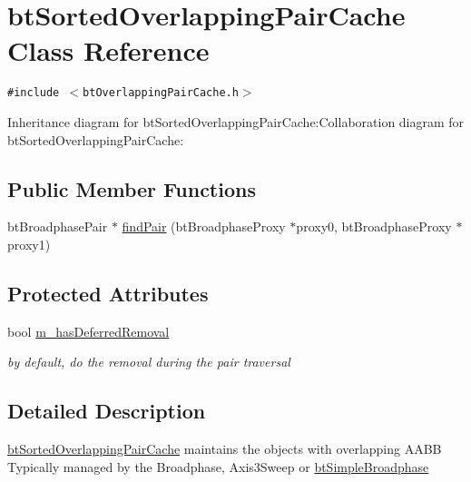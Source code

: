 \hypertarget{classbt_sorted_overlapping_pair_cache}{
\section{btSortedOverlappingPairCache Class Reference}
\label{classbt_sorted_overlapping_pair_cache}
}
{\tt \#include $<$btOverlappingPairCache.h$>$}

Inheritance diagram for btSortedOverlappingPairCache:Collaboration diagram for btSortedOverlappingPairCache:\subsection*{Public Member Functions}
\begin{CompactItemize}
\item 
btBroadphasePair $\ast$ \hyperlink{classbt_sorted_overlapping_pair_cache_73b6665ffd9874f0575b72d07761ce8d}{findPair} (btBroadphaseProxy $\ast$proxy0, btBroadphaseProxy $\ast$proxy1)
\end{CompactItemize}
\subsection*{Protected Attributes}
\begin{CompactItemize}
\item 
\hypertarget{classbt_sorted_overlapping_pair_cache_af79926dc15005b65c34248053af42b9}{
bool \hyperlink{classbt_sorted_overlapping_pair_cache_af79926dc15005b65c34248053af42b9}{m\_\-hasDeferredRemoval}}
\label{classbt_sorted_overlapping_pair_cache_af79926dc15005b65c34248053af42b9}

\begin{CompactList}\small\item\em by default, do the removal during the pair traversal \item\end{CompactList}\end{CompactItemize}


\subsection{Detailed Description}
\hyperlink{classbt_sorted_overlapping_pair_cache}{btSortedOverlappingPairCache} maintains the objects with overlapping AABB Typically managed by the Broadphase, Axis3Sweep or \hyperlink{classbt_simple_broadphase}{btSimpleBroadphase} 


